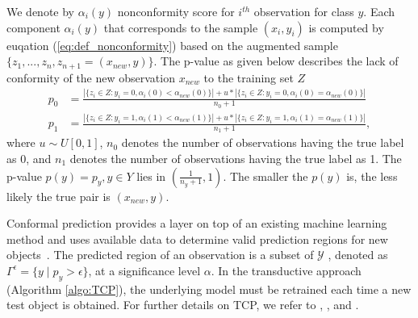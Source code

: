 \documentclass[main]{subfiles}
\begin{document}
We denote by $\alpha_i(y)$ nonconformity score for $i^{th}$ observation for class $y$. Each component  $\alpha_i(y)$ that corresponds to the sample $(x_i,y_i)$ is computed by
euqation (\ref{eq:def_nonconformity}) based on the augmented sample  $\{ z_1 , ..., z_n, z_{n+1}=(x_{new},y) \}$. The p-value as given below describes the lack of conformity of the  new observation $x_{new}$ to the training set $Z$
 \begin{align*}
 p_0 &= \frac{| \{ z_i \in Z : y_i=0, \alpha_i(0) < \alpha_{new}(0) \} | + u* | \{ z_i \in Z : y_i=0, \alpha_i(0) = \alpha_{new}(0)\} |}{n_0+1} \\
 p_1 &= \frac{| \{ z_i \in Z :  y_i=1, \alpha_i(1) < \alpha_{new}(1) \}  |+u*|  \{ z_i \in Z :  y_i=1, \alpha_i(1) =\alpha_{new}(1) \} |}{n_1+1} ,
 \end{align*}
 where $u \sim U[0,1]$, $n_0$ denotes the number of observations having the true label as 0, and $n_1$ denotes the number of observations having the true label as 1.
The p-value $p(y)=p_y, y \in Y$ lies in $ \left( \frac{1}{n_y+1},1 \right)$. The smaller the $p(y)$
 is, the less likely the true pair is $(x_{new},y)$.

 
Conformal prediction provides a layer on top of an existing machine learning method and uses available data to determine valid prediction regions for new objects~\citep{vovk2005algorithmic}. 
The predicted region of an observation is a subset of $\mathcal{Y}$ , denoted as $\Gamma^{\epsilon} = \{ y \mid p_y > \epsilon \}$, at a significance level $\alpha$. In the transductive approach (Algorithm \ref{algo:TCP}), the underlying model must be retrained each time a new test object is obtained. For further details on TCP, we refer to \cite{vapnik1998statistical}, \cite{shafer2008tutorial}, \cite{vovk2005algorithmic} and \cite{balasubramanian2014conformal}. 
\end{document}
